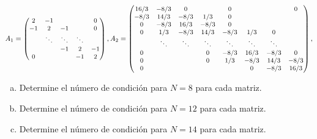 \documentclass[
	spanish,
	9pt,
	utf8,
	xcolor=table,
	handout,
	aspectratio=1610,
	professionalfonts,
	notheorems,
	mathserif,
]{beamer}
\newcounter{savedenum}
\newcommand*{\saveenum}{\setcounter{savedenum}{\theenumi}}
\begin{document}
\begin{frame}
\begin{enumerate}
		      \begin{equation*}\small
			      A_{1}=
			      \begin{pmatrix}
				      2  & -1     &        &        & 0  \\
				      -1 & 2      & -1     &        & 0  \\
				         & \ddots & \ddots & \ddots &    \\
				         &        & -1     & 2      & -1 \\
				      0  &        &        & -1     & 2
			      \end{pmatrix},
			      A_{2}=
			      \begin{pmatrix}
				      16 / 3 & -8 / 3 & 0      &        & 0      &        &        & 0      \\
				      -8 / 3 & 14 / 3 & -8 / 3 & 1 / 3  & 0      &        &        &        \\
				      0      & -8 / 3 & 16 / 3 & -8 / 3 & 0      &        &        &        \\
				      0      & 1 / 3  & -8 / 3 & 14 / 3 & -8 / 3 & 1 / 3  & 0      &        \\
				             & \ddots & \ddots & \ddots & \ddots & \ddots & \ddots &        \\
				      0      &        &        & 0      & -8 / 3 & 16 / 3 & -8 / 3 & 0      \\
				      0      &        &        & 0      & 1 / 3  & -8 / 3 & 14 / 3 & -8 / 3 \\
				      0      &        &        &        &        & 0      & -8 / 3 & 16 / 3
			      \end{pmatrix},
		      \end{equation*}


		      \begin{enumerate}[a)]
			      \item

			            Determine el número de condición para $N=8$ para cada matriz.

			      \item

			            Determine el número de condición para $N=12$ para cada matriz.

			      \item

			            Determine el número de condición para $N=14$ para cada matriz.
		      \end{enumerate}

		      \saveenum
	\end{enumerate}
\end{frame}
\end{document}
